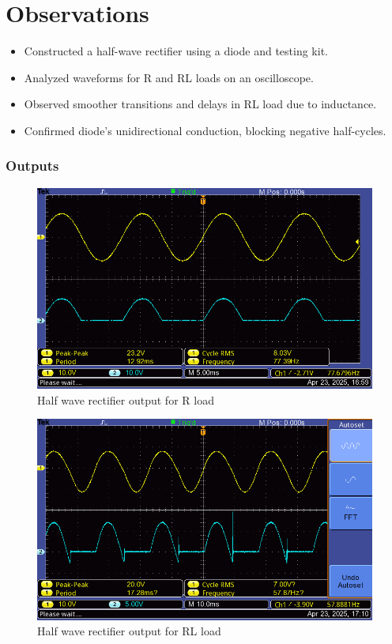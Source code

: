\documentclass[12pt]{article}
\begin{document}
\section*{Observations}
\begin{itemize}
    \item Constructed a half-wave rectifier using a diode and testing kit.
    \item Analyzed waveforms for R and RL loads on an oscilloscope.
    \item Observed smoother transitions and delays in RL load due to inductance.
    \item Confirmed diode's unidirectional conduction, blocking negative half-cycles.
\end{itemize}

\subsubsection*{Outputs}
\begin{figure}[H]
    \centering
    \includegraphics[width=.7\textwidth]{half_r_load3.png}
    \caption{Half wave rectifier output for R load}
    \label{fig:rLoad}
\end{figure}

\begin{figure}[H]
    \centering
    \includegraphics[width=.7\textwidth]{half_rl_load4.png}
    \caption{Half wave rectifier output for RL load}
    \label{fig:rLoadDelay}
\end{figure}


\renewcommand{\bibname}{References}

\end{document}
